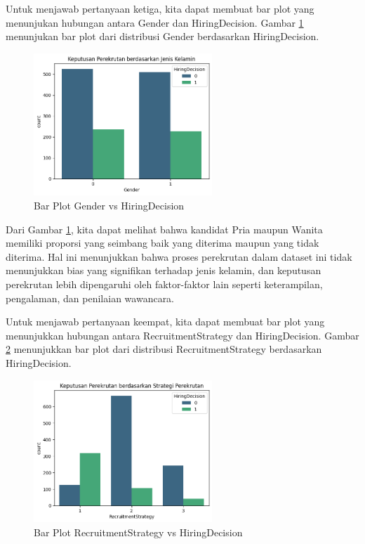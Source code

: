 Untuk menjawab pertanyaan ketiga, kita dapat membuat bar plot yang menunjukan hubungan antara Gender dan HiringDecision. Gambar \ref{fig:barplot4} menunjukan bar plot dari distribusi Gender berdasarkan HiringDecision.

\begin{figure}[H]
    \centering
    \includegraphics[width=0.6\textwidth]{gambar/barplot4.png}
    \caption{Bar Plot Gender vs HiringDecision}
    \label{fig:barplot4}
\end{figure}

Dari Gambar \ref{fig:barplot4}, kita dapat melihat bahwa kandidat Pria maupun Wanita memiliki proporsi yang seimbang baik yang diterima maupun yang tidak diterima. Hal ini menunjukkan bahwa proses perekrutan dalam dataset ini tidak menunjukkan bias yang signifikan terhadap jenis kelamin, dan keputusan perekrutan lebih dipengaruhi oleh faktor-faktor lain seperti keterampilan, pengalaman, dan penilaian wawancara.

Untuk menjawab pertanyaan keempat, kita dapat membuat bar plot yang menunjukkan hubungan antara RecruitmentStrategy dan HiringDecision. Gambar \ref{fig:barplot5} menunjukkan bar plot dari distribusi RecruitmentStrategy berdasarkan HiringDecision.

\begin{figure}[H]
    \centering
    \includegraphics[width=0.6\textwidth]{gambar/barplot5.png}
    \caption{Bar Plot RecruitmentStrategy vs HiringDecision}
    \label{fig:barplot5}
\end{figure}

